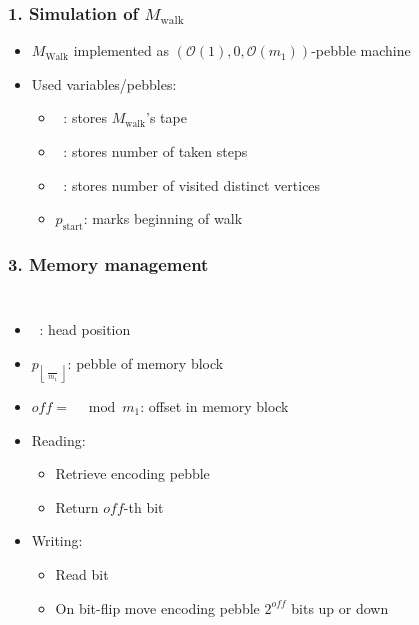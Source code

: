 \documentclass{beamer}
\DeclareMathOperator{\Tid}{T_{\text{id}}}
\DeclareMathOperator{\Tsteps}{T_{\text{steps}}}
\DeclareMathOperator{\Twalk}{T_{\text{walk}}}
\DeclareMathOperator{\Thead}{T_{\text{head}}}
\begin{document}
\appendix
\begin{frame}
  \frametitle{1. Simulation of $M_{\text{walk}}$}
  \begin{itemize}
    \item $M_{\text{Walk}}$ implemented as
      $(\mathcal{O}(1), 0, \mathcal{O}(m_{1}))$-pebble machine
    \item Used variables/pebbles:
      \begin{itemize}
        \item $\Twalk$: stores $M_{\text{walk}}$'s tape
        \item $\Tsteps$: stores number of taken steps
        \item $\Tid$: stores number of visited distinct vertices
        \item $p_{\text{start}}$: marks beginning of walk
      \end{itemize}
  \end{itemize}
\end{frame}

\begin{frame}
  \frametitle{3. Memory management}
  \begin{columns}
    \begin{itemize}
      \item $\Thead$: head position
      \item $p_{\left\lfloor\frac{\Thead}{m_{1}}\right\rfloor}$: pebble of
        memory block
      \item $\mathit{off} = \Thead\mod m_{1}$: offset in memory block
      \item Reading:
        \begin{itemize}
          \item Retrieve encoding pebble
          \item Return $\mathit{off}$-th bit
        \end{itemize}
      \item Writing:
        \begin{itemize}
          \item Read bit
          \item On bit-flip move encoding pebble $2^{\mathit{off}}$ bits up or
            down
        \end{itemize}
    \end{itemize}
    \resizebox{\textwidth}{!}{}
    \resizebox{\textwidth}{!}{}
  \end{columns}
\end{frame}
\end{document}
